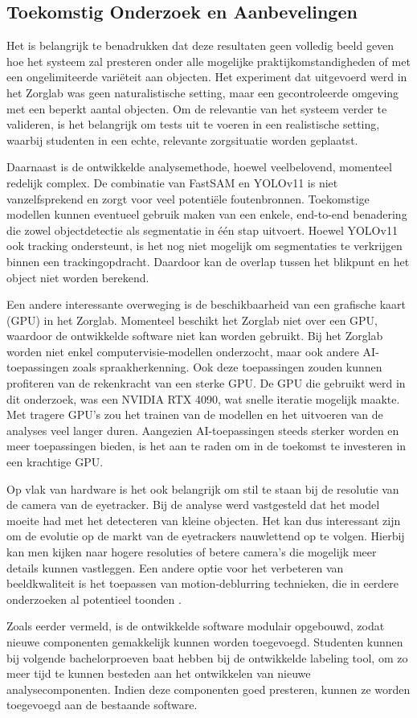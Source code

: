 \subsection{Toekomstig Onderzoek en Aanbevelingen}

Het is belangrijk te benadrukken dat deze resultaten geen volledig beeld geven hoe het 
systeem zal presteren onder alle mogelijke praktijkomstandigheden of met een ongelimiteerde variëteit aan objecten.
Het experiment dat uitgevoerd werd in het Zorglab was geen naturalistische setting,
maar een gecontroleerde omgeving met een beperkt aantal objecten.
Om de relevantie van het systeem verder te valideren, is het belangrijk om tests uit te voeren in een realistische setting,
waarbij studenten in een echte, relevante zorgsituatie worden geplaatst. 

Daarnaast is de ontwikkelde analysemethode, hoewel veelbelovend, momenteel redelijk complex. 
De combinatie van FastSAM en YOLOv11 is niet vanzelfsprekend en zorgt voor veel potentiële foutenbronnen.
Toekomstige modellen kunnen eventueel gebruik maken van een enkele, end-to-end benadering die zowel objectdetectie als segmentatie in één stap uitvoert.
Hoewel YOLOv11 ook tracking ondersteunt, is het nog niet mogelijk om segmentaties te verkrijgen binnen een trackingopdracht. 
Daardoor kan de overlap tussen het blikpunt en het object niet worden berekend.

Een andere interessante overweging is de beschikbaarheid van een grafische kaart (GPU) in het Zorglab.
Momenteel beschikt het Zorglab niet over een GPU, waardoor de ontwikkelde software niet kan worden gebruikt.
Bij het Zorglab worden niet enkel computervisie-modellen onderzocht, maar ook andere AI-toepassingen zoals spraakherkenning.
Ook deze toepassingen zouden kunnen profiteren van de rekenkracht van een sterke GPU.
De GPU die gebruikt werd in dit onderzoek, was een NVIDIA RTX 4090, wat snelle iteratie mogelijk maakte.
Met tragere GPU's zou het trainen van de modellen en het uitvoeren van de analyses veel langer duren. 
Aangezien AI-toepassingen steeds sterker worden en meer toepassingen bieden, 
is het aan te raden om in de toekomst te investeren in een krachtige GPU.

Op vlak van hardware is het ook belangrijk om stil te staan bij de resolutie van de camera van de eyetracker.
Bij de analyse werd vastgesteld dat het model moeite had met het detecteren van kleine objecten.
Het kan dus interessant zijn om de evolutie op de markt van de eyetrackers nauwlettend op te volgen.
Hierbij kan men kijken naar hogere resoluties of betere camera's die mogelijk meer details kunnen vastleggen.
Een andere optie voor het verbeteren van beeldkwaliteit is het toepassen van motion-deblurring technieken, 
die in eerdere onderzoeken al potentieel toonden \autocite{Cederin2023}.

Zoals eerder vermeld, is de ontwikkelde software modulair opgebouwd, zodat nieuwe componenten gemakkelijk kunnen worden toegevoegd.
Studenten kunnen bij volgende bachelorproeven baat hebben bij de ontwikkelde labeling tool, om zo meer tijd te kunnen besteden aan het ontwikkelen van nieuwe analysecomponenten.
Indien deze componenten goed presteren, kunnen ze worden toegevoegd aan de bestaande software.